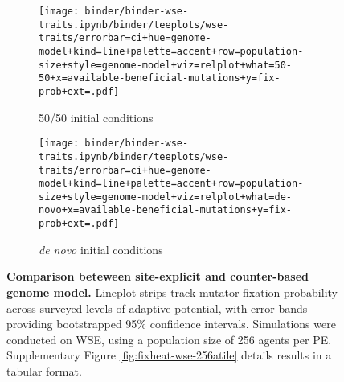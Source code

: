 \begin{sidewaysfigure}[h]
\begin{subfigure}{0.5\linewidth}
  \texttt{[image: binder/binder-wse-traits.ipynb/binder/teeplots/wse-traits/errorbar=ci+hue=genome-model+kind=line+palette=accent+row=population-size+style=genome-model+viz=relplot+what=50-50+x=available-beneficial-mutations+y=fix-prob+ext=.pdf]}%
  \caption{50/50 initial conditions}
\end{subfigure}%
\begin{subfigure}{0.5\linewidth}
  \texttt{[image: binder/binder-wse-traits.ipynb/binder/teeplots/wse-traits/errorbar=ci+hue=genome-model+kind=line+palette=accent+row=population-size+style=genome-model+viz=relplot+what=de-novo+x=available-beneficial-mutations+y=fix-prob+ext=.pdf]}%
  \caption{\textit{de novo} initial conditions}
\end{subfigure}

\begin{minipage}{\textwidth}
  \caption{
  \textbf{Comparison beteween site-explicit and counter-based genome model.}
  \footnotesize
  Lineplot strips track mutator fixation probability across surveyed levels of adaptive potential, with error bands providing bootstrapped 95\% confidence intervals.
  Simulations were conducted on WSE, using a population size of 256 agents per PE.
  Supplementary Figure \ref{fig:fixheat-wse-256atile} details results in a tabular format.
    }
    \label{fig:wse-site-explicit-counter-based}
  \end{minipage}
\end{sidewaysfigure}
